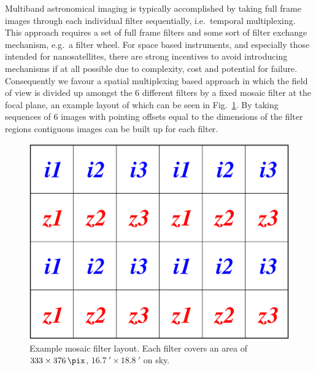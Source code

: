 \documentclass[]{iac}
\begin{document}
Multiband astronomical imaging is typically accomplished by taking full frame images through each individual filter
sequentially, i.e.\ temporal multiplexing. This approach requires a set of full frame filters and some sort of filter
exchange mechanism, e.g.\ a filter wheel. For space based instruments, and especially those intended for nanosatellites,
there are strong incentives to avoid introducing mechanisms if at all possible due to complexity, cost and potential for
failure. Consequently we favour a spatial multiplexing based approach in which the field of view is divided up amongst
the 6 different filters by a fixed mosaic filter at the focal plane, an example layout of which can be seen in
Fig.~\ref{fig:mosaic}. By taking sequences of 6 images with pointing offsets equal to the dimensions of the filter
regions contiguous images can be built up for each filter.

\begin{figure}[tbp]
  \center \includegraphics[width=0.7\columnwidth]{figures/mosaic.pdf}
  \caption{\label{fig:mosaic}Example mosaic filter layout. Each filter covers an area of $333 \times \SI{376}{\pix}$,
    $\SI{16.7}{\arcminute} \times \SI{18.8}{\arcminute}$ on sky.}
\end{figure}
\end{document}
